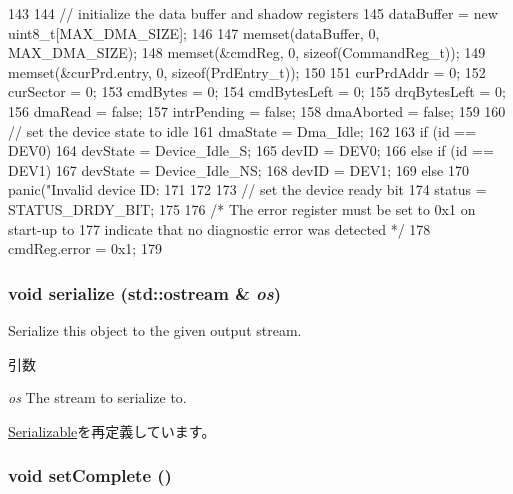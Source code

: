 \begin{DoxyCode}
143 {
144     // initialize the data buffer and shadow registers
145     dataBuffer = new uint8_t[MAX_DMA_SIZE];
146 
147     memset(dataBuffer, 0, MAX_DMA_SIZE);
148     memset(&cmdReg, 0, sizeof(CommandReg_t));
149     memset(&curPrd.entry, 0, sizeof(PrdEntry_t));
150 
151     curPrdAddr = 0;
152     curSector = 0;
153     cmdBytes = 0;
154     cmdBytesLeft = 0;
155     drqBytesLeft = 0;
156     dmaRead = false;
157     intrPending = false;
158     dmaAborted = false;
159 
160     // set the device state to idle
161     dmaState = Dma_Idle;
162 
163     if (id == DEV0) {
164         devState = Device_Idle_S;
165         devID = DEV0;
166     } else if (id == DEV1) {
167         devState = Device_Idle_NS;
168         devID = DEV1;
169     } else {
170         panic("Invalid device ID: %
171     }
172 
173     // set the device ready bit
174     status = STATUS_DRDY_BIT;
175 
176     /* The error register must be set to 0x1 on start-up to
177        indicate that no diagnostic error was detected */
178     cmdReg.error = 0x1;
179 }
\end{DoxyCode}
\hypertarget{classIdeDisk_a53e036786d17361be4c7320d39c99b84}{
\subsubsection[{serialize}]{\setlength{\rightskip}{0pt plus 5cm}void serialize (std::ostream \& {\em os})}}
\label{classIdeDisk_a53e036786d17361be4c7320d39c99b84}
Serialize this object to the given output stream. 
\begin{DoxyParams}{引数}
\item[{\em os}]The stream to serialize to. \end{DoxyParams}


\hyperlink{classSerializable_ad6272f80ae37e8331e3969b3f072a801}{Serializable}を再定義しています。\hypertarget{classIdeDisk_a57e01c0e3593bc187fa343f761ec895a}{
\subsubsection[{setComplete}]{\setlength{\rightskip}{0pt plus 5cm}void setComplete ()}}
\label{classIdeDisk_a57e01c0e3593bc187fa343f761ec895a}



